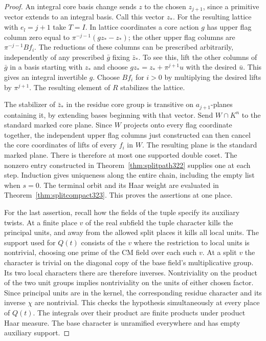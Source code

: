 \documentclass[a4paper,11pt]{article}
\theoremstyle{definition}
\theoremstyle{remark}
\numberwithin{equation}{section}
\begin{document}
\begin{proof}
An integral core basis change sends \(z\) to the chosen
\(z_{j+1}\), since a primitive vector extends to an
integral basis. Call this vector \(z_*\). For the resulting
lattice with \(e_l=j+1\) take \(T=I\). In lattice
coordinates a core action \(g\) has upper flag column zero
equal to \(\pi^{-j-1}(gz_*-z_*)\); the other upper flag
columns are \(\pi^{-j-1}B f_i\). The reductions of these
columns can be prescribed arbitrarily, independently of
any prescribed \(\bar g\) fixing \(\bar z_*\). To see this,
lift the other columns of \(\bar g\) in a basis starting
with \(z_*\) and choose \(gz_*=z_*+\pi^{j+1}u\) with
the desired \(\bar u\). This gives an integral invertible
\(g\). Choose \(B f_i\) for \(i>0\) by multiplying the
desired lifts by \(\pi^{j+1}\). The resulting element of
\(R\) stabilizes the lattice.

The stabilizer of \(\bar z_*\) in the residue core group
is transitive on \(a_{j+1}\)-planes containing it, by
extending bases beginning with that vector. Send \(W\cap K^n\)
to the standard marked core plane. Since \(W\) projects
onto every flag coordinate together, the independent
upper flag columns just constructed can then cancel the
core coordinates of lifts of every \(f_i\) in \(W\).
The resulting plane is the standard marked plane.
There is therefore at most one supported double coset.
The nonzero entry constructed in
Theorem~\ref{thm:splitpath322} supplies one at each step.
Induction gives uniqueness along the entire chain, including
the empty list when \(s=0\). The terminal orbit and its Haar
weight are evaluated in Theorem~\ref{thm:splitcompact323}.
This proves the assertions at one place.

For the last assertion, recall how the fields of the tuple
specify its auxiliary twists. At a finite place \(v\) of
the real subfield the tuple character kills the principal
units, and away from the allowed split places it kills all
local units. The support used for \(Q(t)\) consists of
the \(v\) where the restriction to local units is nontrivial,
choosing one prime of the CM field over each such \(v\).
At a split \(v\) the character is trivial on the diagonal
copy of the base field's multiplicative group. Its two
local characters there are therefore inverses. Nontriviality
on the product of the two unit groups implies nontriviality
on the units of either chosen factor. Since principal units
are in the kernel, the corresponding residue character and
its inverse \(\chi\) are nontrivial. This checks the
hypothesis simultaneously at every place of \(Q(t)\).
The integrals over their product are finite products under
product Haar measure. The base character is unramified
everywhere and has empty auxiliary support.
\end{proof}
\end{document}

